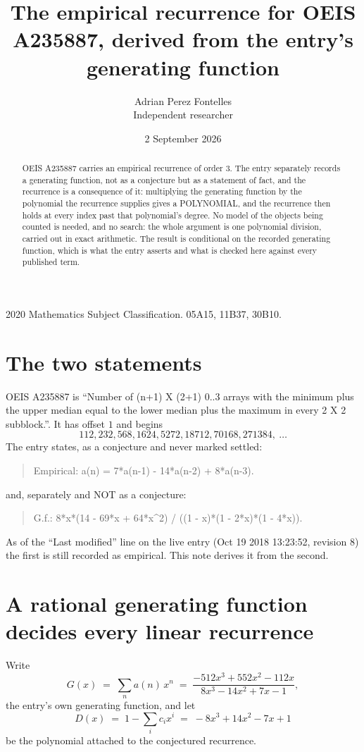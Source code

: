 \documentclass[11pt,a4paper]{article}
\title{The empirical recurrence for OEIS A235887, derived from the entry's generating function}
\author{Adrian Perez Fontelles\\ \small Independent researcher}
\date{2 September 2026}
\theoremstyle{plain}
\theoremstyle{definition}
\begin{document}
\maketitle

\begin{abstract}
OEIS A235887 carries an empirical recurrence of order $3$. The entry separately records a
generating function, not as a conjecture but as a statement of fact, and the recurrence is a
consequence of it: multiplying the generating function by the polynomial the recurrence
supplies gives a POLYNOMIAL, and the recurrence then holds at every index past that
polynomial's degree. No model of the objects being counted is needed, and no search: the
whole argument is one polynomial division, carried out in exact arithmetic. The result is
conditional on the recorded generating function, which is what the entry asserts and what is
checked here against every published term.
\end{abstract}

\noindent\small 2020 Mathematics Subject Classification. 05A15, 11B37, 30B10.\normalsize

\section{The two statements}

OEIS A235887 is ``Number of (n+1) X (2+1) 0..3 arrays with the minimum plus the upper median equal to the lower median plus the maximum in every 2 X 2 subblock.''. It has offset $1$ and begins
\[
112, 232, 568, 1624, 5272, 18712, 70168, 271384,\ \dots
\]
The entry states, as a conjecture and never marked settled:
\begin{quote}
Empirical: a(n) = 7*a(n-1) - 14*a(n-2) + 8*a(n-3).
\end{quote}
and, separately and NOT as a conjecture:
\begin{quote}
G.f.: 8*x*(14 - 69*x + 64*x\^{}2) / ((1 - x)*(1 - 2*x)*(1 - 4*x)).
\end{quote}
As of the ``Last modified'' line on the live entry (Oct 19 2018 13:23:52, revision 8) the first is still
recorded as empirical. This note derives it from the second.

\section{A rational generating function decides every linear recurrence}

Write
\[
G(x)\;=\;\sum_{n}a(n)\,x^{n}\;=\;\frac{- 512 x^{3} + 552 x^{2} - 112 x}{8 x^{3} - 14 x^{2} + 7 x - 1},
\]
the entry's own generating function, and let
\[
D(x)\;=\;1-\sum_i c_i x^{i}\;=\;- 8 x^{3} + 14 x^{2} - 7 x + 1
\]
be the polynomial attached to the conjectured recurrence.
\end{document}
